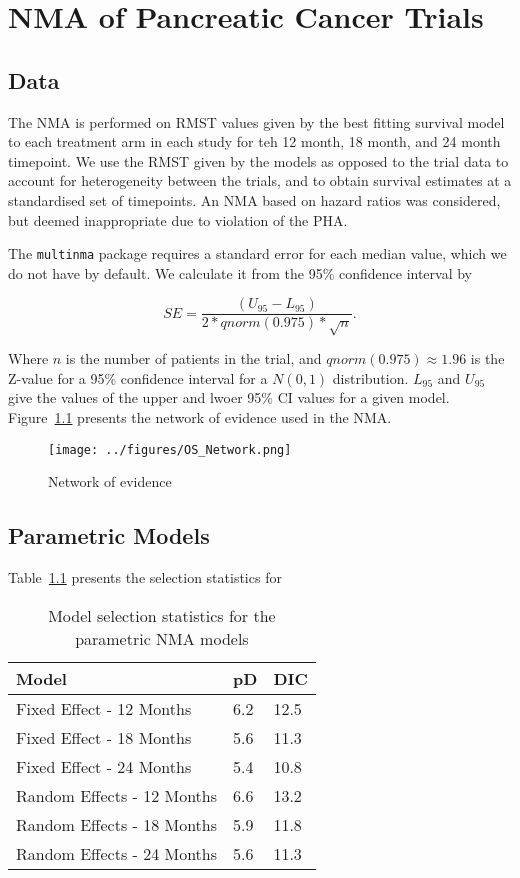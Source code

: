 \chapter{NMA of Pancreatic Cancer Trials}

\section{Data}

The NMA is performed on RMST values given by the best fitting survival model to each treatment arm in each study for teh 12 month, 18 month, and 24 month timepoint. We use the RMST given by the models as opposed to the trial data to account for heterogeneity between the trials, and to obtain survival estimates at a standardised set of timepoints. An NMA based on hazard ratios was considered, but deemed inappropriate due to violation of the PHA.

The \verb|multinma| package requires a standard error for each median value, which we do not have by default. We calculate it from the 95\% confidence interval by 

\[
    SE = \frac{(U_{95}-L_{95})}{2*qnorm(0.975)*\sqrt{n}}.
\]

Where $n$ is the number of patients in the trial, and $qnorm(0.975) \approx 1.96$ is the Z-value for a 95\% confidence interval for a $N(0, 1)$ distribution. $L_{95}$ and $U_{95}$ give the values of the upper and lwoer 95\% CI values for a given model. Figure~\ref{fig:OS_net} presents the network of evidence used in the NMA. 

\begin{figure}[h]
    \centering
    \texttt{[image: ../figures/OS\_Network.png]}
    \caption{Network of evidence}
    \label{fig:OS_net}
\end{figure}

\section{Parametric Models}

Table~\ref{paramDIC} presents the selection statistics for 

\begin{table}[h]
    \center
    \begin{tabular}{lll}
    \hline
    \textbf{Model}          & \textbf{pD}  & \textbf{DIC}  \\ \hline
    Fixed Effect - 12 Months & 6.2 & 12.5 \\
    Fixed Effect - 18 Months & 5.6 & 11.3 \\
    Fixed Effect - 24 Months & 5.4 & 10.8 \\ \hline
    Random Effects - 12 Months & 6.6 & 13.2 \\
    Random Effects - 18 Months & 5.9 & 11.8 \\
    Random Effects - 24 Months & 5.6 & 11.3 \\ \hline
    \end{tabular}
    \caption{Model selection statistics for the parametric NMA models}
    \label{paramDIC}
\end{table}